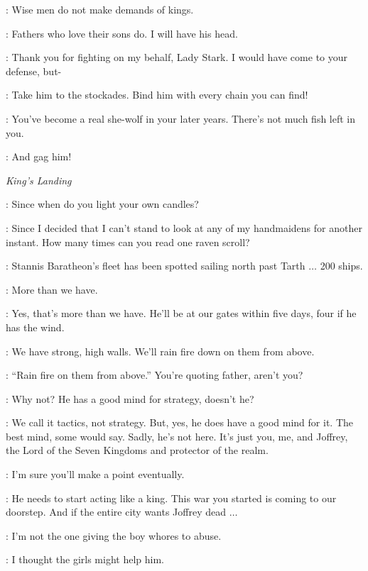 \CATELYN: Wise men do not make demands of kings.

\KARSTARK: Fathers who love their sons do. I will have his head.

\JAIME: Thank you for fighting on my behalf, Lady Stark. I would have come to your defense, but-


\CATELYN: Take him to the stockades. Bind him with every chain you can find!

\JAIME: You've become a real she-wolf in your later years. There's not much fish left in you.

\CATELYN: And gag him!


\scene

\textit{King's Landing}


\TYRION: Since when do you light your own candles?

\CERSEI: Since I decided that I can't stand to look at any of my handmaidens for another instant. How many times can you read one raven scroll?

\TYRION: Stannis Baratheon's fleet has been spotted sailing north past Tarth $\ldots$ 200 ships.

\CERSEI: More than we have.

\TYRION: Yes, that's more than we have. He'll be at our gates within five days, four if he has the wind.

\CERSEI: We have strong, high walls. We'll rain fire down on them from above.

\TYRION: ``Rain fire on them from above.'' You're quoting father, aren't you?

\CERSEI: Why not? He has a good mind for strategy, doesn't he?

\TYRION: We call it tactics, not strategy. But, yes, he does have a good mind for it. The best mind, some would say. Sadly, he's not here. It's just you, me, and Joffrey, the Lord of the Seven Kingdoms and protector of the realm.

\CERSEI: I'm sure you'll make a point eventually.

\TYRION: He needs to start acting like a king. This war you started is coming to our doorstep. And if the entire city wants Joffrey dead $\ldots$

\CERSEI: I'm not the one giving the boy whores to abuse.

\TYRION: I thought the girls might help him.

